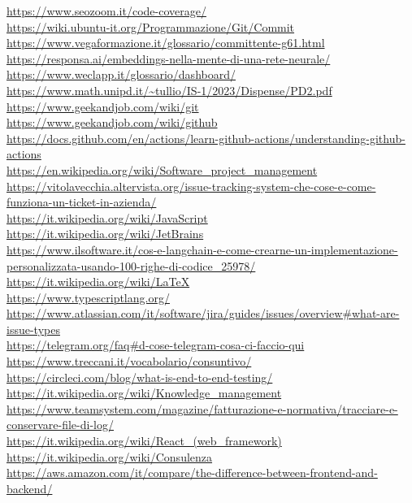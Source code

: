 \begin{small}
\begin{multicols*}{2}
\url{https://www.seozoom.it/code-coverage/}\\
\url{https://wiki.ubuntu-it.org/Programmazione/Git/Commit}\\
\url{https://www.vegaformazione.it/glossario/committente-g61.html}\\
\url{https://responsa.ai/embeddings-nella-mente-di-una-rete-neurale/}\\
\url{https://www.weclapp.it/glossario/dashboard/}\\
\url{https://www.math.unipd.it/~tullio/IS-1/2023/Dispense/PD2.pdf}\\
\url{https://www.geekandjob.com/wiki/git}\\
\url{https://www.geekandjob.com/wiki/github}\\
\url{https://docs.github.com/en/actions/learn-github-actions/understanding-github-actions}\\
\url{https://en.wikipedia.org/wiki/Software_project_management}\\
\url{https://vitolavecchia.altervista.org/issue-tracking-system-che-cose-e-come-funziona-un-ticket-in-azienda/}\\
\url{https://it.wikipedia.org/wiki/JavaScript}\\
\url{https://it.wikipedia.org/wiki/JetBrains}\\
\url{https://www.ilsoftware.it/cos-e-langchain-e-come-crearne-un-implementazione-personalizzata-usando-100-righe-di-codice_25978/}\\
\url{https://it.wikipedia.org/wiki/LaTeX}\\
\url{https://www.typescriptlang.org/}\\
\url{https://www.atlassian.com/it/software/jira/guides/issues/overview#what-are-issue-types}\\
\url{https://telegram.org/faq#d-cose-telegram-cosa-ci-faccio-qui}\\
\url{https://www.treccani.it/vocabolario/consuntivo/}\\
\url{https://circleci.com/blog/what-is-end-to-end-testing/}\\
\url{https://it.wikipedia.org/wiki/Knowledge_management}\\
\url{https://www.teamsystem.com/magazine/fatturazione-e-normativa/tracciare-e-conservare-file-di-log/}\\
\url{https://it.wikipedia.org/wiki/React_(web_framework)}\\
\url{https://it.wikipedia.org/wiki/Consulenza}\\
\url{https://aws.amazon.com/it/compare/the-difference-between-frontend-and-backend/}\\

\end{multicols*}
\end{small}
